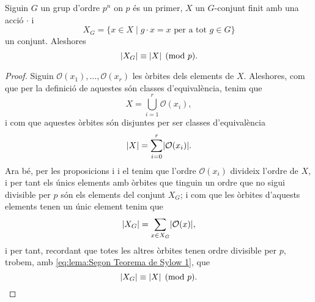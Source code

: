 \documentclass[../../Main.tex]{subfiles}
\begin{document}
	\begin{lemma}
		\label{lema:Segon Teorema de Sylow}
		Siguin \(G\) un grup d'ordre \(p^{n}\) on \(p\) és un primer, \(X\) un \(G\)-conjunt finit amb una acció \(\cdot\) i
		\[X_{G}=\{x\in X\mid g\cdot x=x\text{ per a tot }g\in G\}\]
		un conjunt. Aleshores
		\[\abs{X_{G}}\equiv\abs{X}\pmod{p}.\]
		\begin{proof}
			Siguin \(\mathcal{O}(x_{1}),\dots,\mathcal{O}(x_{r})\) les òrbites dels elements de \(X\). Aleshores, com que per la definició de  aquestes són classes d'equivalència, tenim que %
			\[X=\bigcup_{i=1}^{r}\mathcal{O}(x_{i}),\]
			i com que aquestes òrbites són disjuntes per ser classes d'equivalència
			\begin{equation}
		\label{eq:lema:Segon Teorema de Sylow 1}
			\abs{X}=\sum_{i=0}^{r}\abs{\mathcal{O}(x_{i})}.
			\end{equation}
			Ara bé, per les proposicions  i  i el  tenim que l'ordre \(\mathcal{O}(x_{i})\) divideix l'ordre de \(X\), i per tant els únics elements amb òrbites que tinguin un ordre que no sigui divisible per \(p\) són els elements del conjunt \(X_{G}\); i com que les òrbites d'aquests elements tenen un únic element tenim que
			\[\abs{X_{G}}=\sum_{x\in X_{G}}\abs{\mathcal{O}(x)},\]
			i per tant, recordant que totes les altres òrbites tenen ordre divisible per \(p\), trobem, amb \eqref{eq:lema:Segon Teorema de Sylow 1}, que
			\[\abs{X_{G}}\equiv\abs{X}\pmod{p}.\qedhere\]
		\end{proof}
	\end{lemma}
\end{document}
